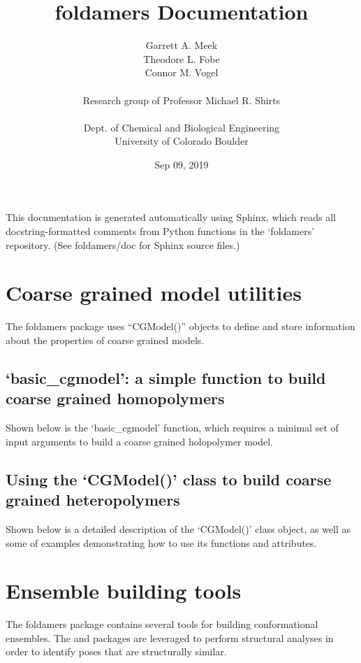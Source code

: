 \documentclass[letterpaper,12pt,english,openany,oneside]{sphinxmanual}
\title{foldamers Documentation}
\date{Sep 09, 2019}
\author{Garrett A. Meek\\Theodore L. Fobe\\Connor M. Vogel\\ \\Research group of Professor Michael R. Shirts\\ \\Dept. of Chemical and Biological Engineering\\University of Colorado Boulder}
\begin{document}
\pagestyle{empty}
\sphinxmaketitle
\pagestyle{plain}
\sphinxtableofcontents
\pagestyle{normal}
\label{\detokenize{index::doc}}


This documentation is generated automatically using Sphinx, which reads all docstring-formatted comments from Python functions in the ‘foldamers’ repository.  (See foldamers/doc for Sphinx source files.)


\chapter{Coarse grained model utilities}
\label{\detokenize{cg_model:coarse-grained-model-utilities}}\label{\detokenize{cg_model::doc}}
The foldamers package uses “CGModel()” objects to define and store information about the properties of coarse grained models.


\section{‘basic\_cgmodel’: a simple function to build coarse grained homopolymers}
\label{\detokenize{cg_model:basic-cgmodel-a-simple-function-to-build-coarse-grained-homopolymers}}
Shown below is the ‘basic\_cgmodel’ function, which requires a minimal set of input arguments to build a coarse grained holopolymer model.

\newpage


\section{Using the ‘CGModel()’ class to build coarse grained heteropolymers}
\label{\detokenize{cg_model:using-the-cgmodel-class-to-build-coarse-grained-heteropolymers}}
Shown below is a detailed description of the ‘CGModel()’ class object, as well as some of examples demonstrating how to use its functions and attributes.


\chapter{Ensemble building tools}
\label{\detokenize{ensembles:ensemble-building-tools}}\label{\detokenize{ensembles::doc}}
The foldamers package contains several tools for building conformational ensembles.  The  and  packages are leveraged to perform structural analyses in order to identify poses that are structurally similar.
\end{document}
